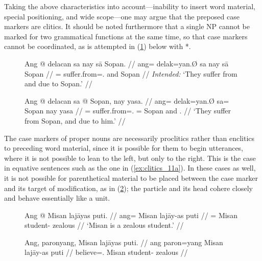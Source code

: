 
Taking the above characteristics into account---inability to insert word
material, special positioning, and wide scope---one may argue that the preposed
case markers are clitics. It should be noted furthermore that a single NP
cannot be marked for two grammatical functions at the same time, so that case
markers cannot be coordinated, as is attempted in (\ref{ex:precasecoord}) below
with *.

\begin{figure}
\pex
\a\label{ex:precasecoord}\ljudge*\begingl
	\gla Ang @ delacan sa nay sā Sopan. //
	\glb ang= delak=yan.Ø sa nay sā Sopan //
	\glc \AgtT{}= suffer.from=\TplM{}.\Top{} \Parg{} and \Caus{} Sopan //
	\glft \textit{Intended:} `They suffer from and due to Sopan.' //
\endgl

\a\begingl
	\gla Ang @ delacan sa @ Sopan, nay yasa. //
	\glb ang= delak=yan.Ø sa= Sopan nay yasa //
	\glc \AgtT{}= suffer.from=\TplM{}.\Top{} \Parg{}= Sopan and 
		\TsgM{}.\Caus{} //
	\glft `They suffer from Sopan, and due to him.' //
	\endgl
\xe
\end{figure}

The case markers of proper nouns are necessarily proclitics rather than
enclitics to preceding word material, since it is possible for them to begin
utterances, where it is not possible to lean to the left, but only to the 
right. This is the case in equative sentences such as the one in 
(\ref{ex:clitics_11a}). In these cases as well, it is not possible for
parenthetical material to be placed between the case marker and its target of
modification, as in (\ref{ex:clitics_11b}); the particle and its head cohere
closely and behave essentially like a unit.

\begin{figure}
\pex\label{ex:clitics_11}
\a\label{ex:clitics_11a}\begingl
	\gla Ang @ Misan lajāyas puti. //
	\glb ang= Misan lajāy-as puti //
	\glc \Aarg{}= Misan student-\Parg{} zealous //
	\glft `Misan is a zealous student.' //
\endgl

\a\label{ex:clitics_11b}\ljudge{*}\begingl
	\gla Ang, paronyang, Misan lajāyas puti. //
	\glb ang paron=yang Misan lajāy-as puti //
	\glc \Aarg{} believe=\Fsg{}.\Aarg{} Misan student-\Parg{} zealous //
\endgl
\xe
\end{figure}

